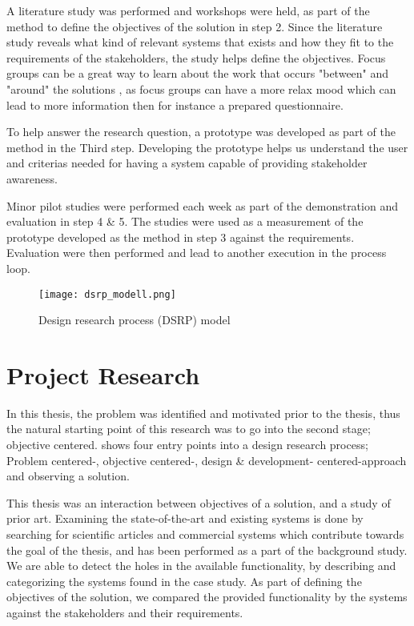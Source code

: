 A literature study was performed and workshops were held, as part of the 
method to define the objectives of the solution in step 2. Since the literature study 
reveals what kind of relevant systems that exists and how they fit to the
requirements of the stakeholders, the study helps define the objectives. Focus
groups can be a great way to learn about the work that occurs "between" and 
"around" the solutions \cite{FocusGroupstoStudyWorkPractice}, as focus groups
can have a more relax mood which can lead to more information then for 
instance a prepared questionnaire.

To help answer the research question, a prototype was developed as part of the 
method in the Third step. Developing the prototype helps us understand the 
user and criterias needed for having a system capable of providing stakeholder 
awareness.

Minor pilot studies were performed each week as part of the demonstration and
evaluation in step 4 \& 5. The studies were used as a measurement of the prototype developed
as the method in step 3 against the requirements. Evaluation were then
performed and lead to another execution in the process loop.

\begin{figure}[!htbp]
	\texttt{[image: dsrp\_modell.png]}
	\caption[Design science research process (DSRP) model]{Design research process (DSRP)
	model\cite{peffers2006design}}
	\label{fig:DSRP}
\end{figure}



\section{Project Research} %
\label{sec:workshops}
In this thesis, the problem was 
identified and motivated prior to the thesis, thus the natural starting 
point of this research was to go into the second stage; objective 
centered.  shows four entry points into a design 
research process; Problem centered-, objective centered-, design \& development-
centered-approach and observing a solution. 

This thesis was an interaction between objectives of a solution, and a study 
of prior art. Examining the state-of-the-art and existing systems is done by 
searching for scientific articles and commercial systems which contribute 
towards the goal of the thesis, and has been performed as a part of the 
background study. We are able to detect the holes in the available 
functionality, by describing and categorizing the systems found in the case 
study. As part of defining the objectives of the solution, we compared the 
provided functionality by the systems against the stakeholders and their 
requirements.\\

